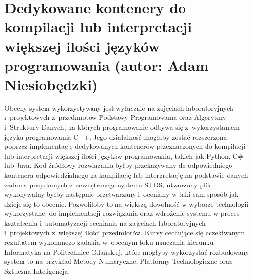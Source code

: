 \section{Dedykowane kontenery do kompilacji lub interpretacji większej ilości języków programowania (autor: Adam Niesiobędzki)}
Obecny system wykorzystywany jest wyłącznie na zajęciach laboratoryjnych i~projektowych z~przedmiotów Podstawy Programowania oraz Algorytmy i~Struktury Danych, na których programowanie odbywa się z~wykorzystaniem języka programowania C++. Jego działalność mogłaby zostać rozszerzona poprzez implementację dedykowanych kontenerów przeznaczonych do kompilacji lub interpretacji większej ilości języków programowania, takich jak Python, C\# lub Java. Kod źródłowy rozwiązania byłby przekazywany do odpowiedniego kontenera odpowiedzialnego za kompilację lub interpretację na podstawie danych zadania pozyskanych z~zewnętrznego systemu STOS, utworzony plik wykonywalny byłby następnie przetwarzany i~oceniany w taki sam sposób jak dzieje się to obecnie. Pozwoliłoby to na większą dowolność w wyborze technologii wykorzystanej do implementacji rozwiązania oraz wdrożenie systemu w proces kształcenia i~automatyzacji oceniania na zajęciach laboratoryjnych i~projektowych z~większej ilości przedmiotów. Kursy cechujące się oczekiwanym rezultatem wykonanego zadania w~obecnym toku nauczania kierunku Informatyka na Politechnice Gdańskiej, które mogłyby wykorzystać rozbudowany system to na przykład Metody Numeryczne, Platformy Technologiczne oraz Sztuczna Inteligencja.